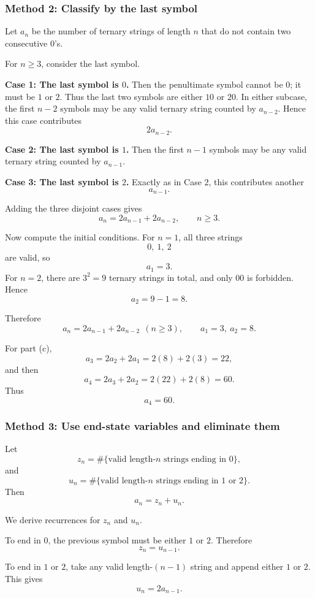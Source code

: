 \documentclass[12pt]{article}
\begin{document}
\subsubsection*{Method 2: Classify by the last symbol}
Let $a_n$ be the number of ternary strings of length $n$ that do not contain two consecutive $0$'s.

For $n\ge 3$, consider the last symbol.

\medskip
\noindent
\textbf{Case 1: The last symbol is $0$.}
Then the penultimate symbol cannot be $0$; it must be $1$ or $2$. Thus the last two symbols are either $10$ or $20$. In either subcase, the first $n-2$ symbols may be any valid ternary string counted by $a_{n-2}$. Hence this case contributes
\[
2a_{n-2}.
\]

\medskip
\noindent
\textbf{Case 2: The last symbol is $1$.}
Then the first $n-1$ symbols may be any valid ternary string counted by $a_{n-1}$.

\medskip
\noindent
\textbf{Case 3: The last symbol is $2$.}
Exactly as in Case 2, this contributes another
\[
a_{n-1}.
\]

Adding the three disjoint cases gives
\[
a_n=2a_{n-1}+2a_{n-2}, \qquad n\ge 3.
\]

Now compute the initial conditions.
For $n=1$, all three strings
\[
0,\ 1,\ 2
\]
are valid, so
\[
a_1=3.
\]
For $n=2$, there are $3^2=9$ ternary strings in total, and only $00$ is forbidden. Hence
\[
a_2=9-1=8.
\]

Therefore
\[
\boxed{a_n=2a_{n-1}+2a_{n-2}\ \ (n\ge 3), \qquad a_1=3,\ a_2=8.}
\]

For part (c),
\[
a_3=2a_2+2a_1=2(8)+2(3)=22,
\]
and then
\[
a_4=2a_3+2a_2=2(22)+2(8)=60.
\]
Thus
\[
\boxed{a_4=60.}
\]

\subsubsection*{Method 3: Use end-state variables and eliminate them}
Let
\[
z_n=\#\{\text{valid length-}n\text{ strings ending in }0\},
\]
and
\[
u_n=\#\{\text{valid length-}n\text{ strings ending in }1\text{ or }2\}.
\]
Then
\[
a_n=z_n+u_n.
\]

We derive recurrences for $z_n$ and $u_n$.

\medskip
\noindent
To end in $0$, the previous symbol must be either $1$ or $2$. Therefore
\[
z_n=u_{n-1}.
\]

To end in $1$ or $2$, take any valid length-$(n-1)$ string and append either $1$ or $2$. This gives
\[
u_n=2a_{n-1}.
\]
\end{document}
